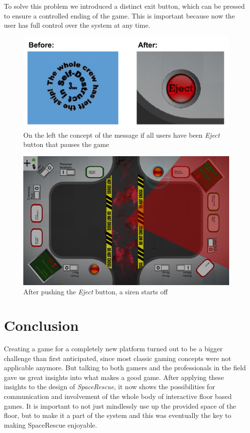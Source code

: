 \documentclass{sigchi}
\begin{document}
To solve this problem we introduced a distinct exit button, which can be pressed to ensure a controlled ending of the game. This is important because now the user has full control over the system at any time. 


\begin{figure}[H]
\centering
\includegraphics[width=0.99\columnwidth]{ejectbutton}
\caption{On the left the concept of the message if all users have been \textit{Eject} button that pauses the game}
\label{fig:gamingArea}
\end{figure}


\begin{figure}[H]
\centering
\includegraphics[width=0.99\columnwidth]{ejecting}
\caption{After pushing the \textit{Eject} button, a siren starts off}
\label{fig:gamingArea}
\end{figure}

\section{Conclusion}
\vspace{1mm}

Creating a game for a completely new platform turned out to be a bigger challenge than first anticipated, since most classic gaming concepts were not applicable anymore. But talking to both gamers and the professionals in the field gave us great insights into what makes a good game. After applying these insights to the design of \textit{SpaceRescue}, it now shows the possibilities for communication and involvement of the whole body of interactive floor based games. It is important to not just mindlessly use up the provided space of the floor, but to make it a part of the system and this was eventually the key to making SpaceRescue enjoyable.\newline





\balance
\end{document}
